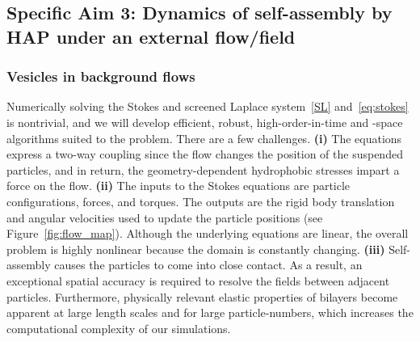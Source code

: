 \subsection{Specific Aim 3: Dynamics of self-assembly by HAP under an external flow/field}
\label{subsec:specific_aim_3}

\subsubsection{Vesicles in background flows}
Numerically solving the Stokes and screened Laplace system~\eqref{SL}
and~\eqref{eq:stokes} is nontrivial, and we will develop efficient,
robust, high-order-in-time and -space algorithms suited to the problem.
There are a few challenges. {\bf (i)} The equations express a two-way
coupling since the flow changes the position of the suspended particles,
and in return, the geometry-dependent hydrophobic stresses impart a
force on the flow. {\bf (ii)} The inputs to the Stokes equations are
particle configurations, forces, and torques. The outputs are the rigid
body translation and angular velocities used to update the particle
positions (see Figure~\ref{fig:flow_map}). Although the underlying
equations are linear, the overall problem is highly nonlinear because
the domain is constantly changing. {\bf (iii)} Self-assembly causes the
particles to come into close contact. As a result, an exceptional
spatial accuracy is required to resolve the fields between adjacent
particles. Furthermore, physically relevant elastic properties of
bilayers become apparent at large length scales and for large
particle-numbers, which increases the computational complexity of our
simulations. 

